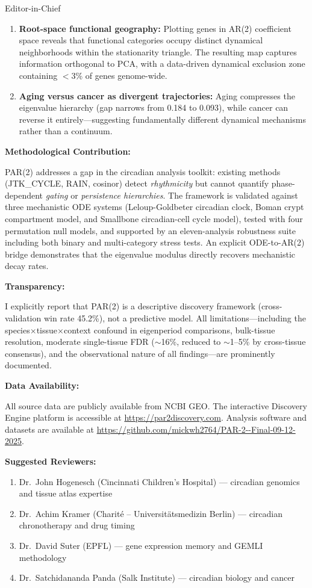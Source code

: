 \documentclass[11pt]{letter}
\begin{document}
\begin{letter}{Editor-in-Chief}
\begin{enumerate}
    \item \textbf{Root-space functional geography:} Plotting genes in AR(2) coefficient space reveals that functional categories occupy distinct dynamical neighborhoods within the stationarity triangle. The resulting map captures information orthogonal to PCA, with a data-driven dynamical exclusion zone containing $<$3\% of genes genome-wide.

    \item \textbf{Aging versus cancer as divergent trajectories:} Aging compresses the eigenvalue hierarchy (gap narrows from 0.184 to 0.093), while cancer can reverse it entirely---suggesting fundamentally different dynamical mechanisms rather than a continuum.
\end{enumerate}

\textbf{Methodological Contribution:}

PAR(2) addresses a gap in the circadian analysis toolkit: existing methods (JTK\_CYCLE, RAIN, cosinor) detect \textit{rhythmicity} but cannot quantify phase-dependent \textit{gating} or \textit{persistence hierarchies}. The framework is validated against three mechanistic ODE systems (Leloup-Goldbeter circadian clock, Boman crypt compartment model, and Smallbone circadian-cell cycle model), tested with four permutation null models, and supported by an eleven-analysis robustness suite including both binary and multi-category stress tests. An explicit ODE-to-AR(2) bridge demonstrates that the eigenvalue modulus directly recovers mechanistic decay rates.

\textbf{Transparency:}

I explicitly report that PAR(2) is a descriptive discovery framework (cross-validation win rate 45.2\%), not a predictive model. All limitations---including the species$\times$tissue$\times$context confound in eigenperiod comparisons, bulk-tissue resolution, moderate single-tissue FDR ($\sim$16\%, reduced to $\sim$1--5\% by cross-tissue consensus), and the observational nature of all findings---are prominently documented.

\textbf{Data Availability:}

All source data are publicly available from NCBI GEO. The interactive Discovery Engine platform is accessible at \url{https://par2discovery.com}. Analysis software and datasets are available at \url{https://github.com/mickwh2764/PAR-2--Final-09-12-2025}.

\textbf{Suggested Reviewers:}

\begin{enumerate}
    \item Dr.~John Hogenesch (Cincinnati Children's Hospital) --- circadian genomics and tissue atlas expertise
    \item Dr.~Achim Kramer (Charit\'{e} -- Universit\"{a}tsmedizin Berlin) --- circadian chronotherapy and drug timing
    \item Dr.~David Suter (EPFL) --- gene expression memory and GEMLI methodology
    \item Dr.~Satchidananda Panda (Salk Institute) --- circadian biology and cancer
\end{enumerate}


\end{letter}
\end{document}
